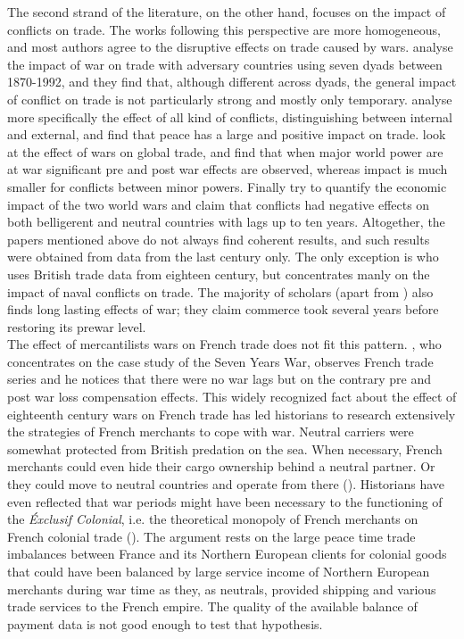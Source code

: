 \documentclass[12pt,a4paper,notitlepage,english]{article}
\begin{document}
The second strand of the literature, on the other hand, focuses on the impact of conflicts on trade. The works following this perspective are more homogeneous, and most authors agree to the disruptive effects on trade caused by wars. \cite{levy2004trading} analyse the impact of war on trade with adversary countries using seven dyads between 1870-1992, and they find that, although different across dyads, the general impact of conflict on trade is not particularly strong and mostly only temporary. \cite{blomberg2006much} analyse more specifically the effect of all kind of conflicts, distinguishing between internal and external, and find that peace has a large and positive impact on trade. \cite{anderton2001impact} look at the effect of wars on global trade, and find that when major world power are at war significant pre and post war effects are observed, whereas impact is much smaller for conflicts between minor powers. Finally \cite{glick2010collateral} try to quantify the economic impact of the two world wars and claim that conflicts had negative effects on both belligerent and neutral countries with lags up to ten years. Altogether, the papers mentioned above do not always find coherent results, and such results were obtained from data from the last century only. The only exception is \cite{rahman2010fighting} who uses British trade data from eighteen century, but concentrates manly on the impact of naval conflicts on trade. The majority of scholars (apart from \cite{levy2004trading}) also finds long lasting effects of war; they claim commerce took several years before restoring its prewar level.\\
The effect of mercantilists wars on French trade does not fit this pattern. \cite{riley_seven_1986}, who concentrates on the case study of the Seven Years War, observes French trade series and he notices that there were no war lags but on the contrary pre and post war loss compensation effects. This widely recognized fact about the effect of eighteenth century wars on French trade has led historians to research extensively the strategies of French merchants to cope with war. Neutral carriers were somewhat protected from British predation on the sea. When necessary, French merchants could even hide their cargo ownership behind a neutral partner. Or they could move to neutral countries and operate from there (\cite{marzagalli_was_2016}). Historians have even reflected that war periods might have been necessary to the functioning of the \textit{Éxclusif Colonial}, i.e. the theoretical monopoly of French merchants on French colonial trade (\cite{lespagnol_mondialisation_1997, morineau_vraie_1997, marzagalli_was_2016}). The argument rests on the large peace time trade imbalances between France and its Northern European clients for colonial goods that could have been balanced by large service income of Northern European merchants during war time as they, as neutrals, provided shipping and various trade services to the French empire. The quality of the available balance of payment data is not good enough to test that hypothesis.\\
\end{document}
